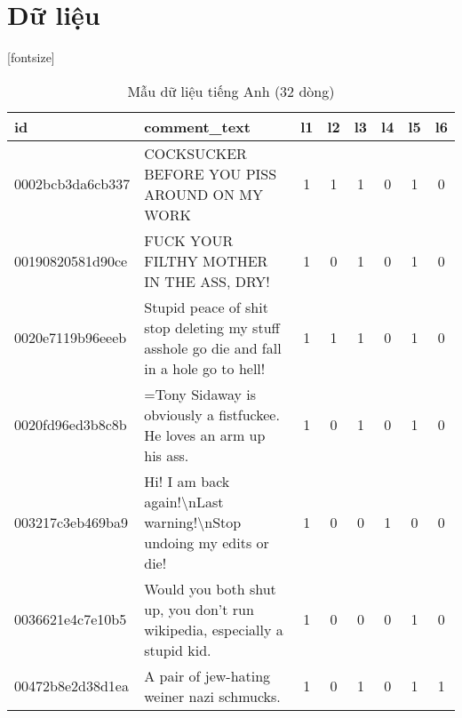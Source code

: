 \section*{Dữ liệu}
\begin{sidewaystable}[htb!]
    \centering
    \caption{Mẫu dữ liệu tiếng Anh (32 dòng)}
    \label{table:dataset-english}
    [fontsize]
    \fontsize{8pt}{12pt}\selectfont
    \begin{tabularx}{\textwidth}{L{0.8} L{6.6} C{0.1} C{0.1} C{0.1} C{0.1} C{0.1} C{0.1}}
        \toprule
        \textbf{id}      & \textbf{comment\_text}                                                                                                           & \textbf{l1} & \textbf{l2} & \textbf{l3} & \textbf{l4} & \textbf{l5} & \textbf{l6} \\\midrule
        0002bcb3da6cb337 & COCKSUCKER BEFORE YOU PISS AROUND ON MY WORK                                                                                     & 1           & 1           & 1           & 0           & 1           & 0           \\
        00190820581d90ce & FUCK YOUR FILTHY MOTHER IN THE ASS, DRY!                                                                                         & 1           & 0           & 1           & 0           & 1           & 0           \\
        0020e7119b96eeeb & Stupid peace of shit stop deleting my stuff asshole go die and fall in a hole go to hell!                                        & 1           & 1           & 1           & 0           & 1           & 0           \\
        0020fd96ed3b8c8b & =Tony Sidaway is obviously a fistfuckee. He loves an arm up his ass.                                                             & 1           & 0           & 1           & 0           & 1           & 0           \\
        003217c3eb469ba9 & Hi! I am back again!\textbackslash nLast warning!\textbackslash nStop undoing my edits or die!                                   & 1           & 0           & 0           & 1           & 0           & 0           \\
        0036621e4c7e10b5 & Would you both shut up, you don't run wikipedia, especially a stupid kid.                                                        & 1           & 0           & 0           & 0           & 1           & 0           \\
        00472b8e2d38d1ea & A pair of jew-hating weiner nazi schmucks.                                                                                       & 1           & 0           & 1           & 0           & 1           & 1           \\

\end{tabularx}
\end{sidewaystable}
